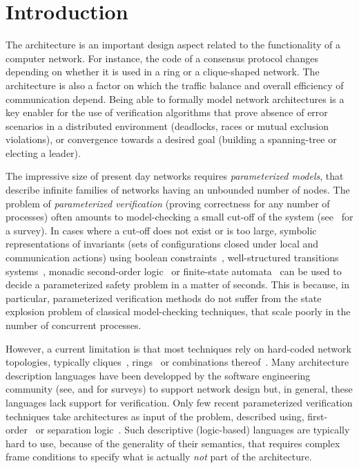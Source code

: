 \section{Introduction}

The architecture is an important design aspect related to the
functionality of a computer network. For instance, the code of a
consensus protocol changes depending on whether it is used in a ring
or a clique-shaped network. The architecture is also a factor on which
the traffic balance and overall efficiency of communication
depend. Being able to formally model network architectures is a key
enabler for the use of verification algorithms that prove absence of
error scenarios in a distributed environment (\eg deadlocks, races
or mutual exclusion violations), or convergence towards a desired goal
(\eg building a spanning-tree or electing a leader).

The impressive size of present day networks requires
\emph{parameterized models}, that describe infinite families of
networks having an unbounded number of nodes. The problem of
\emph{parameterized verification} (\ie proving correctness for any
number of processes) often amounts to model-checking a small cut-off
of the system (see~\cite{BloemJacobsKhalimovKonnovRubinVeithWidder15}
for a survey). In cases where a cut-off does not exist or is too
large, symbolic representations of invariants (\ie sets of
configurations closed under local and communication actions) using \eg
boolean constraints~\cite{DBLP:conf/concur/EsparzaRW22},
well-structured transitions
systems~\cite{DBLP:conf/lics/AbdullaCJT96}, monadic second-order
logic~\cite{DBLP:journals/jlap/BozgaIS21} or finite-state
automata~\cite{DBLP:conf/birthday/LinR21} can be used to decide a
parameterized safety problem in a matter of seconds. This is because,
in particular, parameterized verification methods do not suffer from
the state explosion problem of classical model-checking techniques,
that scale poorly in the number of concurrent processes.

However, a current limitation is that most techniques rely on
hard-coded network topologies, typically
cliques~\cite{GermanSistla92}, rings~\cite{ClarkeGrumbergBrowne86} or
combinations thereof~\cite{DBLP:journals/dc/AminofKRSV18}. Many
architecture description languages have been developped by the
software engineering community (see, \eg \cite{bradbury2004survey} and
\cite{rumpe2017classification} for surveys) to support network design
but, in general, these languages lack support for verification. Only
few recent parameterized verification techniques take architectures as
input of the problem, described using, \eg
first-order~\cite{DBLP:conf/tacas/BozgaEISW20} or separation
logic~\cite{DBLP:journals/tcs/BozgaIS23}. Such descriptive
(logic-based) languages are typically hard to use, because of the
generality of their semantics, that requires complex frame conditions
to specify what is actually \emph{not} part of the architecture.

